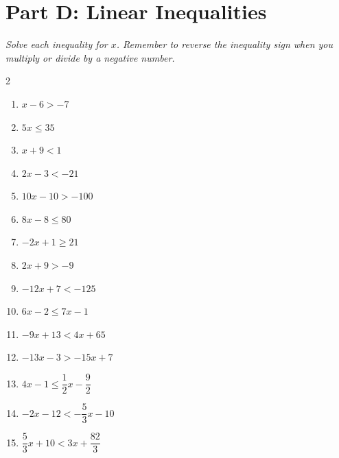 \documentclass[11pt]{article}
\begin{document}
\section*{Part D: Linear Inequalities}
\noindent\textit{Solve each inequality for $x$. Remember to reverse the inequality sign when you multiply or divide by a negative number.}
\begin{multicols}{2}
\begin{enumerate}
  \item $x - 6 > -7$
  \vspace{1.8cm}
  \item $5x \le 35$
  \vspace{1.8cm}
  \item $x + 9 < 1$
  \vspace{1.8cm}
  \item $2x - 3 < -21$
  \vspace{1.8cm}
  \item $10x - 10 > -100$
  \vspace{1.8cm}
  \item $8x - 8 \le 80$
  \vspace{1.8cm}
  \item $-2x + 1 \ge 21$
  \vspace{1.8cm}
  \item $2x + 9 > -9$
  \vspace{1.8cm}
  \item $-12x + 7 < -125$
  \vspace{1.8cm}
  \item $6x - 2 \le 7x - 1$
  \vspace{1.8cm}
  \item $-9x + 13 < 4x + 65$
  \vspace{1.8cm}
  \item $-13x - 3 > -15x + 7$
  \vspace{1.8cm}
  \item $4x - 1 \le \dfrac{1}{2}x - \dfrac{9}{2}$
  \vspace{1.8cm}
  \item $-2x - 12 < -\dfrac{5}{3}x - 10$
  \vspace{1.8cm}
  \item $\dfrac{5}{3}x + 10 < 3x + \dfrac{82}{3}$
  \vspace{1.8cm}
\end{enumerate}
\end{multicols}
\end{document}
